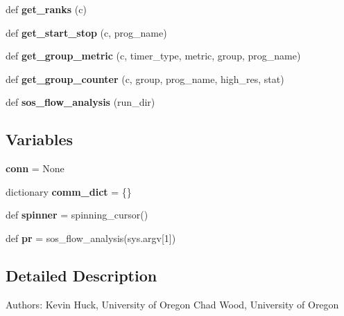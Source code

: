 \begin{DoxyCompactItemize}
def {\bfseries get\+\_\+ranks} (c)
\item 
\mbox{\label{namespacecodar_1_1cheetah_1_1sos__flow__analysis_a4abc9cee3399580bfd5acb8e48bc630b}} 
def {\bfseries get\+\_\+start\+\_\+stop} (c, prog\+\_\+name)
\item 
\mbox{\label{namespacecodar_1_1cheetah_1_1sos__flow__analysis_a2d7af86e3ed05179b09887d4e50eeceb}} 
def {\bfseries get\+\_\+group\+\_\+metric} (c, timer\+\_\+type, metric, group, prog\+\_\+name)
\item 
\mbox{\label{namespacecodar_1_1cheetah_1_1sos__flow__analysis_a19fa4d586fb92ae5984cb624c98b84cd}} 
def {\bfseries get\+\_\+group\+\_\+counter} (c, group, prog\+\_\+name, high\+\_\+res, stat)
\item 
\mbox{\label{namespacecodar_1_1cheetah_1_1sos__flow__analysis_aad19aab91348a15d173f47113bd587eb}} 
def {\bfseries sos\+\_\+flow\+\_\+analysis} (run\+\_\+dir)
\end{DoxyCompactItemize}
\subsection*{Variables}
\begin{DoxyCompactItemize}
\item 
\mbox{\label{namespacecodar_1_1cheetah_1_1sos__flow__analysis_abee15f9319de7f405645cc717fa02b23}} 
{\bfseries conn} = None
\item 
\mbox{\label{namespacecodar_1_1cheetah_1_1sos__flow__analysis_afc06b061556b637f6c085fd67c6fcb3e}} 
dictionary {\bfseries comm\+\_\+dict} = \{\}
\item 
\mbox{\label{namespacecodar_1_1cheetah_1_1sos__flow__analysis_afcb8b6f79f8ae87b4ae4732f695b0ad1}} 
def {\bfseries spinner} = spinning\+\_\+cursor()
\item 
\mbox{\label{namespacecodar_1_1cheetah_1_1sos__flow__analysis_a307c888c43500c0a7ee10eb20b544d76}} 
def {\bfseries pr} = sos\+\_\+flow\+\_\+analysis(sys.\+argv\mbox{[}1\mbox{]})
\end{DoxyCompactItemize}


\subsection{Detailed Description}
\begin{DoxyVerb}Authors:
Kevin Huck, University of Oregon
Chad Wood, University of Oregon
\end{DoxyVerb}
 